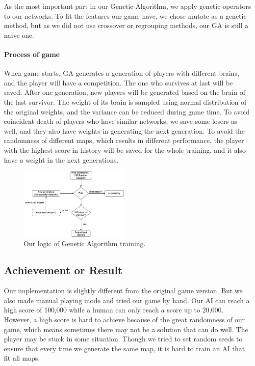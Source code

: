 \documentclass[final]{cvpr}
\begin{document}
   As the most important part in our Genetic Algorithm, we apply genetic operators to our networks. To fit the features our game have, we chose mutate as a genetic method, but as we did not use crossover or regrouping methods, our GA is still a naive one. 

\paragraph{Process of game}
   When game starts, GA generates a generation of players with different brains, and the player will have a competition. The one who survives at last will be saved. After one generation, new players will be generated based on the brain of the last survivor. The weight of its brain is sampled using normal distribution of the original weights, and the variance can be reduced during game time. To avoid coincident death of players who have similar networks, we save some losers as well, and they also have weights in generating the next generation. To avoid the randomness of different maps, which results in different performance, the player with the highest score in history will be saved for the whole training, and it also have a weight in the next generations.
   
\begin{figure}[htbp]
    \centering
    \includegraphics[width=0.48\textwidth]{2.png}
    \caption{Our logic of Genetic Algorithm training. }
    \label{fig:game}
\end{figure}

\subsection{Achievement or Result}
Our implementation is slightly different from the original game version. But we also made manual playing mode and tried our game by hand. Our AI can reach a high score of 100,000 while a human can only reach a score up to 20,000. However, a high score is hard to achieve because of the great randomness of our game, which means sometimes there may not be a solution that can do well. The player may be stuck in some situation. Though we tried to set random seeds to ensure that every time we generate the same map, it is hard to train an AI that fit all maps.
\end{document}
